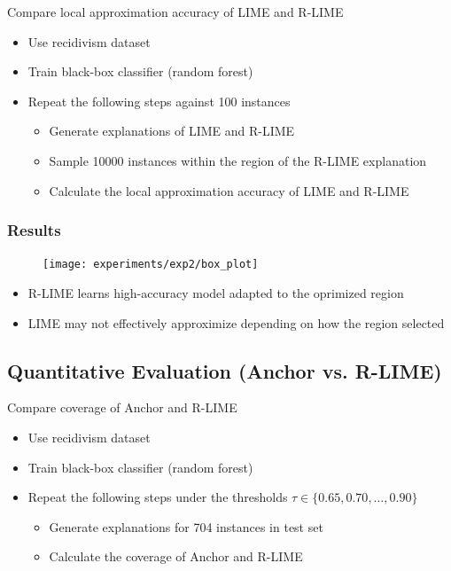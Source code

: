 \documentclass[aspectratio=169]{slide-en}
\begin{document}
\begin{frame}{}
  Compare local approximation accuracy of LIME and R-LIME
  \begin{itemize}
    \item Use recidivism dataset
    \item Train black-box classifier (random forest)
    \item Repeat the following steps against 100 instances
          \begin{itemize}
            \item Generate explanations of LIME and R-LIME
            \item Sample 10000 instances within the region of
                  the R-LIME explanation
            \item Calculate the local approximation accuracy of LIME and R-LIME
          \end{itemize}
  \end{itemize}
\end{frame}

\subsubsection{Results}
\begin{frame}{}
  \begin{figure}
    \texttt{[image: experiments/exp2/box\_plot]}
  \end{figure}
  \begin{itemize}
    \item R-LIME learns high-accuracy model adapted to the oprimized region
    \item LIME may not effectively approximize depending on how the region selected
  \end{itemize}
\end{frame}

\subsection{Quantitative Evaluation (Anchor vs. R-LIME)}

\begin{frame}{}
  Compare coverage of Anchor and R-LIME
  \begin{itemize}
    \item Use recidivism dataset
    \item Train black-box classifier (random forest)
    \item Repeat the following steps under the thresholds $\tau\in\{0.65,0.70,\dots,0.90\}$
          \begin{itemize}
            \item Generate explanations for 704 instances in test set
            \item Calculate the coverage of Anchor and R-LIME
          \end{itemize}
  \end{itemize}
\end{frame}
\end{document}
